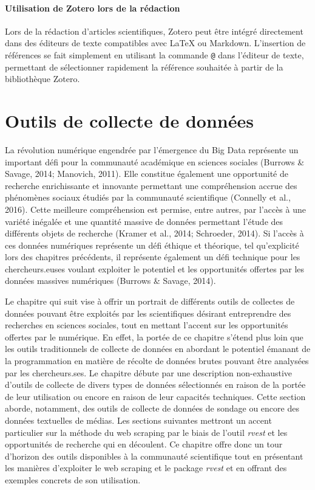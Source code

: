 \documentclass[
  letterpaper,
  DIV=11,
  numbers=noendperiod]{scrreprt}
\begin{document}
\subsubsection{Utilisation de Zotero lors de la
rédaction}\label{utilisation-de-zotero-lors-de-la-ruxe9daction}

Lors de la rédaction d'articles scientifiques, Zotero peut être intégré
directement dans des éditeurs de texte compatibles avec LaTeX ou
Markdown. L'insertion de références se fait simplement en utilisant la
commande \texttt{@} dans l'éditeur de texte, permettant de sélectionner
rapidement la référence souhaitée à partir de la bibliothèque Zotero.


\chapter{Outils de collecte de données}\label{sec-chap5}

La révolution numérique engendrée par l'émergence du Big Data représente
un important défi pour la communauté académique en sciences sociales
(Burrows \& Savage, 2014; Manovich, 2011). Elle constitue également une
opportunité de recherche enrichissante et innovante permettant une
compréhension accrue des phénomènes sociaux étudiés par la communauté
scientifique (Connelly et al., 2016). Cette meilleure compréhension est
permise, entre autres, par l'accès à une variété inégalée et une
quantité massive de données permettant l'étude des différents objets de
recherche (Kramer et al., 2014; Schroeder, 2014). Si l'accès à ces
données numériques représente un défi éthique et théorique, tel
qu'explicité lors des chapitres précédents, il représente également un
défi technique pour les chercheurs.euses voulant exploiter le potentiel
et les opportunités offertes par les données massives numériques
(Burrows \& Savage, 2014).

Le chapitre qui suit vise à offrir un portrait de différents outils de
collectes de données pouvant être exploités par les scientifiques
désirant entreprendre des recherches en sciences sociales, tout en
mettant l'accent sur les opportunités offertes par le numérique. En
effet, la portée de ce chapitre s'étend plus loin que les outils
traditionnels de collecte de données en abordant le potentiel émanant de
la programmation en matière de récolte de données brutes pouvant être
analysées par les chercheurs.ses. Le chapitre débute par une description
non-exhaustive d'outils de collecte de divers types de données
sélectionnés en raison de la portée de leur utilisation ou encore en
raison de leur capacités techniques. Cette section aborde, notamment,
des outils de collecte de données de sondage ou encore des données
textuelles de médias. Les sections suivantes mettront un accent
particulier sur la méthode du web scraping par le biais de l'outil
\emph{rvest} et les opportunités de recherche qui en découlent. Ce
chapitre offre donc un tour d'horizon des outils disponibles à la
communauté scientifique tout en présentant les manières d'exploiter le
web scraping et le package \emph{rvest} et en offrant des exemples
concrets de son utilisation.
\end{document}
